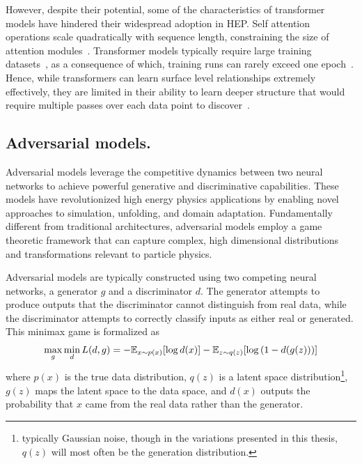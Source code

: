             However, despite their potential, some of the characteristics of transformer models have hindered their widespread adoption in HEP.
            Self attention operations scale quadratically with sequence length, constraining the size of attention modules~\cite{Vaswani2017AttentionNeed}.
            Transformer models typically require large training datasets~\cite{zhao_large-scale_2024}, as a consequence of which, training runs can rarely exceed one epoch~\cite{miao_locality-sensitive_2024}.
            Hence, while transformers can learn surface level relationships extremely effectively, they are limited in their ability to learn deeper structure that would require multiple passes over each data point to discover~\cite{caron_trackformers_2025, Wang2024InterpretingTagging, stroud_transformers_2024}.
    
    \subsection{Adversarial models.}
        Adversarial models leverage the competitive dynamics between two neural networks to achieve powerful generative and discriminative capabilities.
        These models have revolutionized high energy physics applications by enabling novel approaches to simulation, unfolding, and domain adaptation.
        Fundamentally different from traditional architectures, adversarial models employ a game theoretic framework that can capture complex, high dimensional distributions and transformations relevant to particle physics.
    
        Adversarial models are typically constructed using two competing neural networks, a generator \(g\) and a discriminator \(d\).
        The generator attempts to produce outputs that the discriminator cannot distinguish from real data, while the discriminator attempts to correctly classify inputs as either real or generated.
        This minimax game is formalized as
        \begin{equation}
            \max_g \min_d L(d, g) = -\mathbb{E}_{x \sim p(x)}[\log d(x)] - \mathbb{E}_{z \sim q(z)}[\log\qty(1 - d(g(z)))]
        \end{equation}
        where \(p(x)\) is the true data distribution, \(q(z)\) is a latent space distribution\footnote{typically Gaussian noise, though in the variations presented in this thesis, \(q(z)\) will most often be the generation distribution.}, \(g(z)\) maps the latent space to the data space, and \(d(x)\) outputs the probability that
        \(x\) came from the real data rather than the generator.
    
